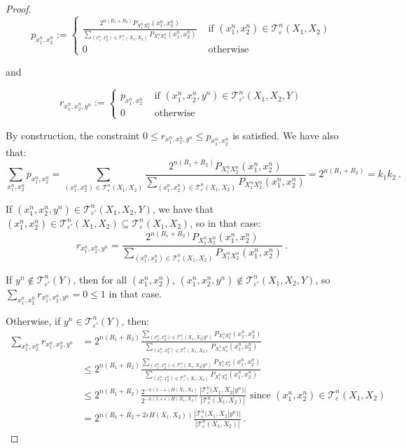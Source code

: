 \documentclass[11pt]{article}
\theoremstyle{definition}
\theoremstyle{remark}
\begin{document}
\begin{proof}
  \[ p_{x_1^n,x_2^n} := \begin{cases}
    \frac{2^{n(R_1+R_2)}P_{X_1^nX_2^n}(x_1^n,x_2^n)}{\sum_{(x_1^n,x_2^n) \in \mathcal{T}^n_{\varepsilon}(X_1,X_2)}P_{X_1^nX_2^n}(x_1^n,x_2^n)} & \text{ if } (x_1^n,x_2^n) \in \mathcal{T}^n_{\varepsilon}(X_1,X_2) \\
    0 & \text{ otherwise}
  \end{cases}
  \]

  and

  \[ r_{x_1^n,x_2^n,y^n} := \begin{cases}
    p_{x_1^n,x_2^n} & \text{ if } (x_1^n,x_2^n,y^n) \in \mathcal{T}^n_{\varepsilon'}(X_1,X_2,Y) \\
    0 & \text{ otherwise}
  \end{cases}
    \]

    By construction, the constraint $0 \leq r_{x_1^n,x_2^n,y^n} \leq p_{x_1^n,x_2^n}$ is satisfied. We have also that:
    \[\sum_{x_1^n,x_2^n} p_{x_1^n,x_2^n} = \sum_{(x_1^n,x_2^n) \in \mathcal{T}^n_{\varepsilon}(X_1,X_2)} \frac{2^{n(R_1+R_2)}P_{X_1^nX_2^n}(x_1^n,x_2^n)}{\sum_{(x_1^n,x_2^n) \in \mathcal{T}^n_{\varepsilon}(X_1,X_2)}P_{X_1^nX_2^n}(x_1^n,x_2^n)} = 2^{n(R_1+R_2)} = k_1k_2 \ . \]

    If $(x_1^n,x_2^n,y^n) \in \mathcal{T}^n_{\varepsilon'}(X_1,X_2,Y)$, we have that $(x_1^n,x_2^n) \in \mathcal{T}^n_{\varepsilon'}(X_1,X_2) \subseteq \mathcal{T}^n_{\varepsilon}(X_1,X_2)$, so in that case:
    \[ r_{x_1^n,x_2^n,y^n} = \frac{2^{n(R_1+R_2)}P_{X_1^nX_2^n}(x_1^n,x_2^n)}{\sum_{(x_1^n,x_2^n) \in \mathcal{T}^n_{\varepsilon}(X_1,X_2)}P_{X_1^nX_2^n}(x_1^n,x_2^n)} \ . \]

    If $y^n \not\in \mathcal{T}^n_{\varepsilon'}(Y)$, then for all $(x_1^n,x_2^n)$, $(x_1^n,x_2^n,y^n) \notin \mathcal{T}^n_{\varepsilon'}(X_1,X_2,Y)$, so $\sum_{x_1^n,x_2^n} r_{x_1^n,x_2^n,y^n}  = 0 \leq 1$ in that case.

    Otherwise, if $y^n \in \mathcal{T}^n_{\varepsilon'}(Y)$, then:
    \begin{equation}
      \begin{aligned}
        \sum_{x_1^n,x_2^n} r_{x_1^n,x_2^n,y^n} &= 2^{n(R_1+R_2)} \frac{\sum_{(x_1^n,x_2^n) \in \mathcal{T}^n_{\varepsilon'}(X_1,X_2|y^n)} P_{X_1^nX_2^n}(x_1^n,x_2^n)}{\sum_{(x_1^n,x_2^n) \in \mathcal{T}^n_{\varepsilon}(X_1,X_2)}P_{X_1^nX_2^n}(x_1^n,x_2^n)}\\
        &\leq 2^{n(R_1+R_2)} \frac{\sum_{(x_1^n,x_2^n) \in \mathcal{T}^n_{\varepsilon}(X_1,X_2|y^n)} P_{X_1^nX_2^n}(x_1^n,x_2^n)}{\sum_{(x_1^n,x_2^n) \in \mathcal{T}^n_{\varepsilon}(X_1,X_2)}P_{X_1^nX_2^n}(x_1^n,x_2^n)}\\
        &\leq 2^{n(R_1+R_2)}\frac{2^{-n(1-\varepsilon)H(X_1,X_2)}}{2^{-n(1+\varepsilon)H(X_1,X_2)}} \frac{|\mathcal{T}^n_{\varepsilon}(X_1,X_2|y^n)|}{|\mathcal{T}^n_{\varepsilon}(X_1,X_2)|} \text{ since $(x_1^n,x_2^n) \in \mathcal{T}^n_{\varepsilon}(X_1,X_2)$} \\
        &= 2^{n(R_1+R_2 + 2\varepsilon H(X_1,X_2))}\frac{|\mathcal{T}^n_{\varepsilon}(X_1,X_2|y^n)|}{|\mathcal{T}^n_{\varepsilon}(X_1,X_2)|} \ .
      \end{aligned}
    \end{equation}


\end{proof}
\end{document}
